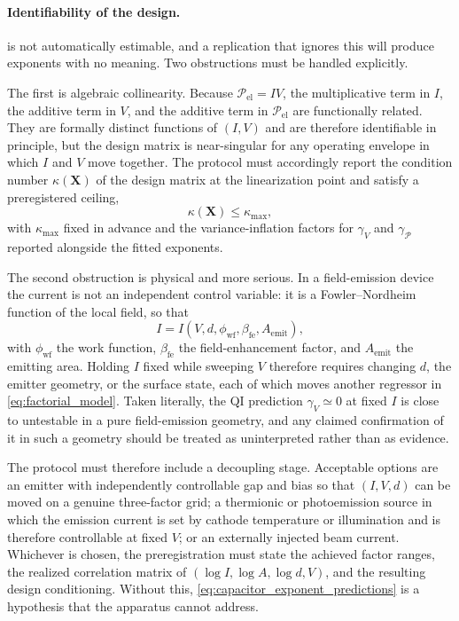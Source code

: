 \documentclass[11pt]{article}
\begin{document}
\paragraph{Identifiability of the design.}  is not automatically estimable, and a replication that ignores this will produce exponents with no meaning. Two obstructions must be handled explicitly.

The first is algebraic collinearity. Because \(\mathcal P_{\mathrm{el}}=IV\), the multiplicative term in \(I\), the additive term in \(V\), and the additive term in \(\mathcal P_{\mathrm{el}}\) are functionally related. They are formally distinct functions of \((I,V)\) and are therefore identifiable in principle, but the design matrix is near-singular for any operating envelope in which \(I\) and \(V\) move together. The protocol must accordingly report the condition number \(\kappa(\mathbf X)\) of the design matrix at the linearization point and satisfy a preregistered ceiling,
\begin{equation}
    \kappa(\mathbf X)\le\kappa_{\max},
    \label{eq:design_conditioning}
\end{equation}
with \(\kappa_{\max}\) fixed in advance and the variance-inflation factors for \(\gamma_V\) and \(\gamma_{\mathcal P}\) reported alongside the fitted exponents.

The second obstruction is physical and more serious. In a field-emission device the current is not an independent control variable: it is a Fowler--Nordheim function of the local field, so that
\begin{equation}
    I=I(V,d,\phi_{\mathrm{wf}},\beta_{\mathrm{fe}},A_{\mathrm{emit}}),
    \label{eq:fowler_nordheim_coupling}
\end{equation}
with \(\phi_{\mathrm{wf}}\) the work function, \(\beta_{\mathrm{fe}}\) the field-enhancement factor, and \(A_{\mathrm{emit}}\) the emitting area. Holding \(I\) fixed while sweeping \(V\) therefore requires changing \(d\), the emitter geometry, or the surface state, each of which moves another regressor in \cref{eq:factorial_model}. Taken literally, the QI prediction \(\gamma_V\simeq0\) at fixed \(I\) is close to untestable in a pure field-emission geometry, and any claimed confirmation of it in such a geometry should be treated as uninterpreted rather than as evidence.

The protocol must therefore include a decoupling stage. Acceptable options are an emitter with independently controllable gap and bias so that \((I,V,d)\) can be moved on a genuine three-factor grid; a thermionic or photoemission source in which the emission current is set by cathode temperature or illumination and is therefore controllable at fixed \(V\); or an externally injected beam current. Whichever is chosen, the preregistration must state the achieved factor ranges, the realized correlation matrix of \((\log I,\log A,\log d,V)\), and the resulting design conditioning. Without this, \cref{eq:capacitor_exponent_predictions} is a hypothesis that the apparatus cannot address.
\end{document}
